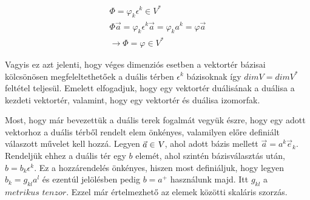 \documentclass[a4paper, 12pt]{article}
\begin{document}
\begin{align*}
\Phi = \varphi_{k}\epsilon^{k} \in V^{*} \\
\Phi\vec{a} = \varphi_{k}\epsilon^{k}\vec{a} = \varphi_{k}a^{k} = \varphi\vec{a} \\
\rightarrow \Phi = \varphi \in V^{*}
\end{align*}
\par Vagyis ez azt jelenti, hogy véges dimenziós esetben a vektortér bázisai kölcsönösen megfeleltethetőek a duális térben $\epsilon^{k}$ bázisoknak így $dimV = dimV^{*}$ feltétel teljesül. Emelett elfogadjuk, hogy egy vektortér duálisának a duálisa a kezdeti vektortér, valamint, hogy egy vektortér és duálisa izomorfak.
\newline
\par Most, hogy már bevezettük a duális terek fogalmát vegyük észre, hogy egy adott vektorhoz a duális térből rendelt elem önkényes, valamilyen előre definiált válaszott művelet kell hozzá. Legyen $\vec{a} \in \textsl{V}$, ahol adott bázis mellett $\vec{a} = a^{k}\vec{e}_{k}$. Rendeljük ehhez a duális tér egy $b$ elemét, ahol szintén bázisválasztás után, $b = b_{k}\epsilon^{k}$. Ez a hozzárendelés önkényes, hiszen most definiáljuk, hogy legyen $b_{k} = g_{kl}a^{l}$ és ezentúl jelölésben pedig $b = a^{+}$ használunk majd. Itt $g_{kl}$ a $\textit{metrikus tenzor}$. Ezzel már értelmezhető az elemek közötti skaláris szorzás.
\end{document}

